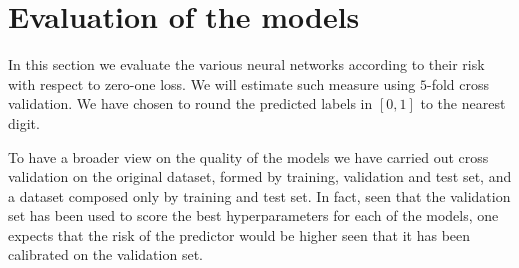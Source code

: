 \section{Evaluation of the models}\label{3_evaluation}
In this section we evaluate the various neural networks according to their risk with respect to zero-one loss. We will estimate such measure using $5$-fold cross validation. We have chosen to round the predicted labels in $\left[0,1\right]$ to the nearest digit.

To have a broader view on the quality of the models we have carried out cross validation on the original dataset, formed by training, validation and test set, and a dataset composed only by training and test set. In fact, seen that the validation set has been used to score the best hyperparameters for each of the models, one expects that the risk of the predictor would be higher seen that it has been calibrated on the validation set. 

